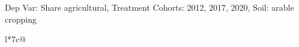 \begin{table}[H]
\captionlistentry[table]{}
\label{table:beaver_land_class_DVis_land_class_1_SCg123_SSAC}
\scriptsize %
Dep Var: Share agricultural, Treatment Cohorts: 2012, 2017, 2020, Soil: arable cropping \\
\begin{threeparttable}
\begin{tabulary}{\textwidth}{l*{7}{c}@{}}
\toprule \toprule
\noalign{\smallskip}
\noalign{\smallskip}
\midrule \bottomrule
\end{tabulary}
\medskip
\end{threeparttable}
\end{table}
